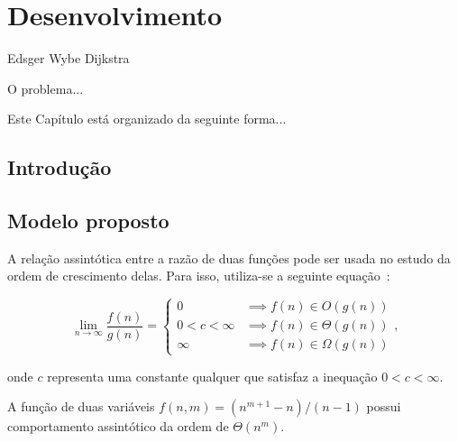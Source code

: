 
\chapter{Desenvolvimento}
\label{cap:3:desenvolvimento}

{Edsger Wybe Dijkstra}

O problema...

Este Capítulo está organizado da seguinte forma...

\section{Introdução}
\label{sec:3:introducao}

\section{Modelo proposto}
\label{sec:3:modelo}

A relação assintótica entre a razão de duas funções pode ser usada no estudo da
ordem de crescimento delas.
Para isso, utiliza-se a seguinte
equação~\cite{brassard1996fundamentals,cormen2009algorithms}:
\begin{linenomath}
\begin{equation}\label{eq:asymtheorem}
\lim_{n\rightarrow\infty}\frac{f(n)}{g(n)}=
    \left\{
    \begin{array}{cl}
    0               & \implies f(n) \in O(g(n)) \\
    0 < c < \infty  & \implies f(n) \in \Theta(g(n)) \\
    \infty          & \implies f(n) \in \Omega(g(n)) 
    \end{array}
    \right.\text{,}
\end{equation}
\end{linenomath}
onde $c$ representa uma constante qualquer que satisfaz a inequação
$0<c<\infty$.

\begin{lema}[Comportamento assintótico de $f(n,m)=(n^{m+1}-n)/(n-1)$]
\label{lem:comptns}
A função de duas variáveis $f(n,m)=(n^{m+1}-n)/(n-1)$ possui comportamento
assintótico da ordem de $\Theta(n^m)$.
\end{lema}

